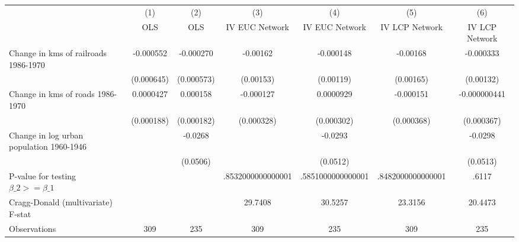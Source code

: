 {
\def\sym#1{\ifmmode^{#1}\else\(^{#1}\)\fi}
\begin{tabular}{l*{6}{c}}
\hline\hline
                &\multicolumn{1}{c}{(1)}&\multicolumn{1}{c}{(2)}&\multicolumn{1}{c}{(3)}&\multicolumn{1}{c}{(4)}&\multicolumn{1}{c}{(5)}&\multicolumn{1}{c}{(6)}\\
                &\multicolumn{1}{c}{OLS}&\multicolumn{1}{c}{OLS}&\multicolumn{1}{c}{IV EUC Network}&\multicolumn{1}{c}{IV EUC Network}&\multicolumn{1}{c}{IV LCP Network}&\multicolumn{1}{c}{IV LCP Network}\\
\hline
Change in kms of railroads 1986-1970&-0.000552         &-0.000270         & -0.00162         &-0.000148         & -0.00168         &-0.000333         \\
                &(0.000645)         &(0.000573)         &(0.00153)         &(0.00119)         &(0.00165)         &(0.00132)         \\
[1em]
Change in kms of roads 1986-1970&0.0000427         & 0.000158         &-0.000127         &0.0000929         &-0.000151         &-0.000000441         \\
                &(0.000188)         &(0.000182)         &(0.000328)         &(0.000302)         &(0.000368)         &(0.000367)         \\
[1em]
Change in log urban population 1960-1946&                  &  -0.0268         &                  &  -0.0293         &                  &  -0.0298         \\
                &                  & (0.0506)         &                  & (0.0512)         &                  & (0.0513)         \\
\hline
P-value for testing $\beta\_{2} >= \beta\_{1}$&                  &                  &.8532000000000001         &.5851000000000001         &.8482000000000001         &    .6117         \\
Cragg-Donald (multivariate) F-stat&                  &                  &  29.7408         &  30.5257         &  23.3156         &  20.4473         \\
Observations    &      309         &      235         &      309         &      235         &      309         &      235         \\
\hline\hline
\end{tabular}
}

